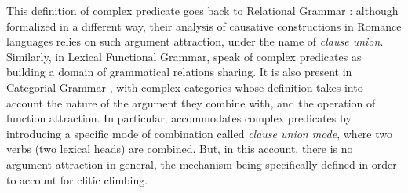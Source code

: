 \documentclass[output=paper
                ,modfonts
                ,nonflat
	        ,collection
	        ,collectionchapter
	        ,collectiontoclongg
 	        ,biblatex
                ,babelshorthands
                ,newtxmath
                ,draftmode
                ,colorlinks, citecolor=brown
]{./langsci/langscibook}
\begin{document}
{\eal 
	\label{GSexemple1} 
	\label{GSexemple1a} 
		
	\label{GSexemple1b}  
		
	\label{GSexemple1c} 
\zl


\eal 
	\label{GSexemple2} 
	\label{GSexemple2a}
		
	\label{GSexemple2b}
		
		
	\label{GSexemple2c}			
\zl


This definition of complex predicate goes back to Relational Grammar \citep{aissen1983clause}: although formalized in a different way, their analysis of causative constructions in Romance languages relies on such argument attraction, under the name of \emph{clause union}. Similarly, in Lexical Functional Grammar, \cite{andrews1999complex} speak of complex predicates as building a domain of grammatical relations sharing. It is also present in Categorial Grammar \citep{Geach70a}, with complex categories whose definition takes into account the nature of the argument they combine with, and the operation of function attraction. In particular, \cite{kraak1998deductive} accommodates complex predicates by introducing a specific mode of combination called \emph{clause union mode}, where two verbs (two lexical heads) are combined. But, in this account, there is no argument attraction in general, the mechanism being specifically defined in order to account for clitic climbing.


}
\end{document}
